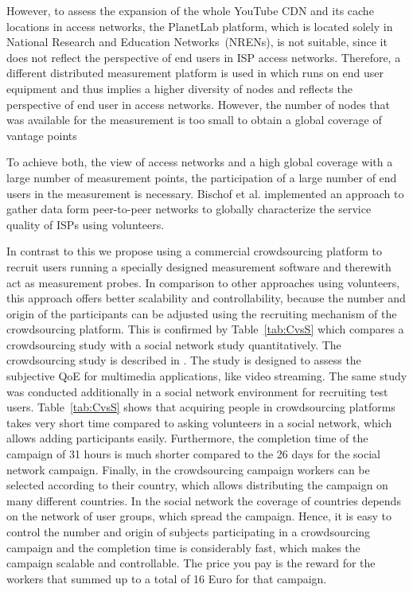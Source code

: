However, to assess the expansion of the whole YouTube CDN and its cache locations in access networks, the PlanetLab platform, which is located solely in National Research and Education Networks~(NRENs), is not suitable, since it does not reflect the perspective of end users in ISP access networks.
Therefore, a different distributed measurement platform is used in \cite{rafetseder2011exploring} which runs on end user equipment and thus implies a higher diversity of nodes and reflects the perspective of end user in access networks.
However, the number of nodes that was available for the measurement is too small to obtain a global coverage of vantage points

To achieve both, the view of access networks and a high global coverage with a large number of measurement points, the participation of a large number of end users in the measurement is necessary.
Bischof et al. \cite{bischof2011crowdsourcing} implemented an approach to gather data form peer-to-peer networks to globally characterize the service quality of ISPs using volunteers.

In contrast to this we propose using a commercial crowdsourcing platform to recruit users running a specially designed measurement software and therewith act as measurement probes.
In comparison to other approaches using volunteers, this approach offers better scalability and controllability, because the number and origin of the participants can be adjusted using the recruiting mechanism of the crowdsourcing platform.
This is confirmed by Table~\ref{tab:CvsS} which compares a crowdsourcing study with a social network study quantitatively. The crowdsourcing study  is described in \cite{bookchapter2013-18}. The study is designed to assess the subjective QoE for multimedia applications, like video streaming.
The same study was conducted additionally in a social network environment for recruiting test users.
Table~\ref{tab:CvsS} shows that acquiring people in crowdsourcing platforms takes very short time compared to asking volunteers in a social network, which allows adding participants easily.
Furthermore, the completion time of the campaign of 31 hours is much shorter compared to the 26 days for the social network campaign.
Finally, in the crowdsourcing campaign workers can be selected according to their country, which allows distributing the campaign on many different countries. In the social network the coverage of countries depends on the network of user groups, which spread the campaign.
Hence, it is easy to control the number and origin of subjects participating in a crowdsourcing campaign and the completion time is considerably fast, which makes the campaign scalable and controllable. The price you pay is the reward for the workers that summed up to a total of 16 Euro for that campaign.

